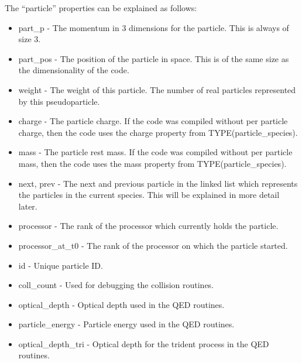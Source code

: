The ``particle'' properties can be explained as follows:
\begin{itemize}
\item part\_p - The momentum in 3 dimensions for the particle. This is always
  of size 3.
\item part\_pos - The position of the particle in space. This is of the same
  size as the dimensionality of the code.
\item weight - The weight of this particle. The number of real particles
  represented by this pseudoparticle.
\item charge - The particle charge. If the code was compiled without per
  particle charge, then the code uses the charge property from
  TYPE(particle\_species).
\item mass - The particle rest mass. If the code was compiled without per
  particle mass, then the code uses the mass property from
  TYPE(particle\_species).
\item next, prev - The next and previous particle in the linked list which
  represents the particles in the current species. This will be explained in
  more detail later.
\item processor - The rank of the processor which currently holds the
  particle.
\item processor\_at\_t0 - The rank of the processor on which the particle
  started.
\item id - Unique particle ID.
\item coll\_count - Used for debugging the collision routines.
\item optical\_depth - Optical depth used in the QED routines.
\item particle\_energy - Particle energy used in the QED routines.
\item optical\_depth\_tri - Optical depth for the trident process in the QED
                            routines.
\end{itemize}

